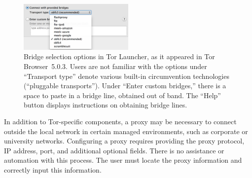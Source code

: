 \documentclass[USenglish,oneside,twocolumn]{article}
\begin{document}
\begin{figure}
  \centering
    \includegraphics[width=0.5\textwidth]{bridge-options.png}
\caption{
Bridge selection options in Tor Launcher, as it appeared in Tor Browser~5.0.3.
Users are not familiar with the options under ``Transport type'' denote various
built-in circumvention technologies (``pluggable transports'').
Under ``Enter custom bridges,'' there is a space to paste in
a bridge line, obtained out of band.
The ``Help'' button displays instructions on obtaining
bridge lines. 
}
\label{fig:bridge-options}
\end{figure}

In addition to Tor-specific components, a proxy may be necessary to connect 
outside the local network in certain managed environments, such as corporate or university networks.
Configuring a proxy requires providing the proxy protocol, IP address, port, and additional optional
fields. There is no assistance or automation with this process. The user must locate the 
proxy information and correctly input this information. 
  
\end{document}
